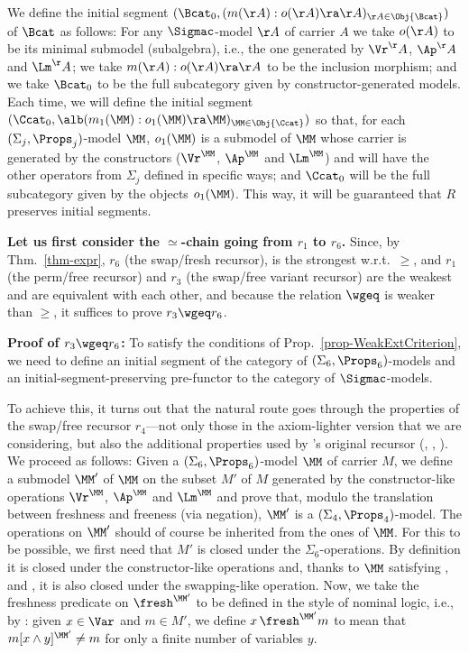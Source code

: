 		We define the initial segment $(\Bcat_0,(m(\AA):o(\AA)\ra \AA)_{\AA \in \Obj{\Bcat}})$ of $\Bcat$ as follows: For any $\Sigmac$-model $\AA$ of carrier $A$ we take 
		$o(\AA)$ to be its minimal submodel (subalgebra), 
		i.e., the one generated by 
		$\Vr^\AA$, $\Ap^\AA$ and $\Lm^\AA$; we take $m(\AA): o(\AA) \ra \AA$ to be the inclusion morphism; and we take $\Bcat_0$ to be the full subcategory given by constructor-generated models. 
		Each time, we will define the initial segment $(\Ccat_0,\alb(m_1(\MM):o_1(\MM)\ra \MM)_{\MM \in \Obj{\Ccat}})$ 
		so that, for each $(\Sigma_j,\Props_j)$-model $\MM$, 
		$o_1(\MM)$ is a submodel of $\MM$ whose carrier is generated by the constructors ($\Vr^\MM$, $\Ap^\MM$ and $\Lm^\MM$) and will have the other operators from $\Sigma_j$ defined in specific ways; and $\Ccat_0$ will be the full subcategory given by the objects $o_1(\MM)$. 
		This way, it will be guaranteed that $R$ preserves initial segments. 
		
		\textbf{Let us first consider the $\simeq$-chain going from $r_1$ to $r_6$.} 
		Since, by Thm.~\ref{thm-expr}, $r_6$ (the swap/fresh recursor), is the strongest w.r.t.\ $\geq$, and $r_1$ (the perm/free recursor) and $r_3$ (the swap/free variant recursor) are the weakest and are equivalent with each other, 
		and because the relation $\wgeq$ is weaker than $\geq$, 
		it suffices to prove $r_3 \wgeq r_6$.  
		
		\textbf{Proof of $r_3 \wgeq r_6$:} 
		To satisfy the conditions of Prop.~\ref{prop-WeakExtCriterion}, we need to define an initial segment of the category of $(\Sigma_6,\Props_6)$-models and an initial-segment-preserving pre-functor to the category of $\Sigmac$-models. 
		
		To achieve this, it turns out that the natural route goes through the properties of the swap/free recursor $r_4$---not only those in the axiom-lighter version that we are considering, but also the additional properties used by \citet{primrecFOAS-Norrish04}'s original recursor (\FvSw{}, \SwId{}, \SwIv{}).  
		We proceed as follows: Given a $(\Sigma_6,\Props_6)$-model $\MM$ of carrier $M$, we 
		define a submodel $\MM'$ of $\MM$ on the subset $M'$ of $M$ generated by the constructor-like operations $\Vr^\MM$, $\Ap^\MM$ and $\Lm^\MM$ 
		and prove that, modulo the translation between freshness and freeness (via negation), $\MM'$ is a $(\Sigma_4,\Props_4)$-model. 
		The operations on $\MM'$ should of course be inherited from the ones of $\MM$. 
		For this to be possible, we first need that $M'$ is closed under the $\Sigma_6$-operations. By definition it is closed under the constructor-like operations and, 
		thanks to $\MM$ satisfying \SwVr{}, \SwAp{} and \SwLm{}, it is also closed under the swapping-like operation.   Now, we take the freshness predicate on $\fresh^{\MM'}$ to be 
		defined in the style of nominal logic, i.e., by %
		\FrDSw{}: %
		 given $x\in\Var$ and $m\in M'$, we define 
		$x \,\fresh^{\MM'} m$ to mean that $m[x \wedge y]^{\MM'} \not= m$ for only a finite number of variables $y$.
		
